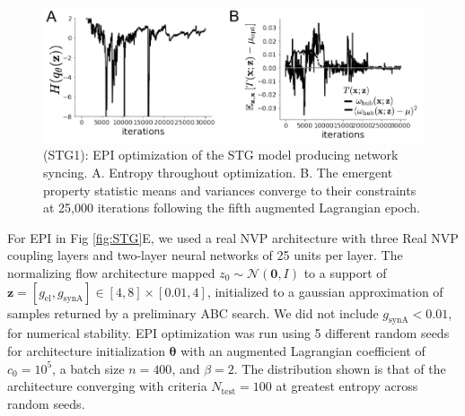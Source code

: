 \documentclass[11pt]{article}
\begin{document}
\begin{figure}
\begin{center}
\includegraphics[scale=0.8]{figures/figSTG1/figSTG1.pdf}
\end{center}
\begin{flushleft}
\caption{\small (STG1): EPI optimization of the STG model producing network syncing. 
A. Entropy throughout optimization. 
B. The emergent property statistic means and variances converge to their constraints at 25,000 iterations following the fifth augmented Lagrangian epoch.}
\end{flushleft}
\label{fig:STG1}
\end{figure}

For EPI in Fig \ref{fig:STG}E, we used a real NVP architecture with three Real NVP coupling layers and two-layer neural networks of 25 units per layer.
The normalizing flow architecture mapped $z_0 \sim \mathcal{N}(\mathbf{0}, I)$ to a support of $\mathbf{z} = [g_{\text{el}}, g_{\text{synA}}] \in [4,8] \times [0.01,4]$, initialized to a gaussian approximation of samples returned by a preliminary ABC search.
We did not include $g_{\text{synA}} < 0.01$, for numerical stability.
EPI optimization was run using 5 different random seeds for architecture initialization $\bm{\theta}$ with an augmented Lagrangian coefficient of $c_0 = 10^{5}$, a batch size $n=400$, and $\beta = 2$.
The distribution shown is that of the architecture converging with criteria $N_{\text{test}} = 100$ at greatest entropy across random seeds.
\end{document}
